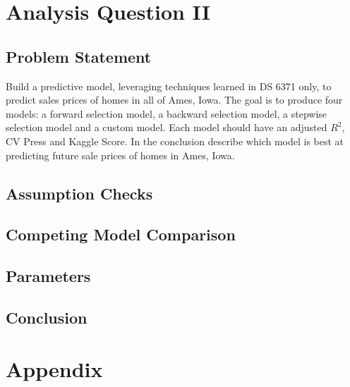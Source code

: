 \documentclass[american,]{article}
\begin{document}
\section{Analysis Question II}\label{analysis-question-ii}

\subsection{Problem Statement}\label{problem-statement-1}

Build a predictive model, leveraging techniques learned in DS 6371 only,
to predict sales prices of homes in all of Ames, Iowa. The goal is to
produce four models: a forward selection model, a backward selection
model, a stepwise selection model and a custom model. Each model should
have an adjusted \(R^{2}\), CV Press and Kaggle Score. In the conclusion
describe which model is best at predicting future sale prices of homes
in Ames, Iowa.

\subsection{Assumption Checks}\label{assumption-checks}

\subsection{Competing Model
Comparison}\label{competing-model-comparison}

\subsection{Parameters}\label{parameters}

\subsection{Conclusion}\label{conclusion}

\citet{Hastie2009} \citet{Trefethen1997}

\section{Appendix}\label{appendix}

\renewcommand\refname{References}

\end{document}
